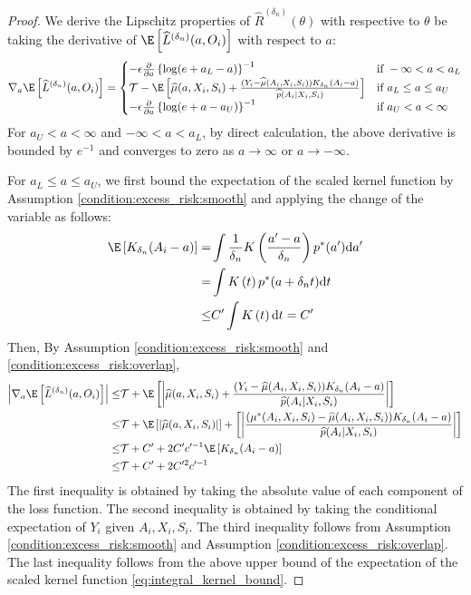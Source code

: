 \begin{proof}
\noindent We derive the Lipschitz properties of $\widehat R^{({\delta_n})}(\theta)$ with respective to $\theta$ be taking the derivative of $\E\left[\widehat L^{({\delta_n})}(a,O_i)\right]$ with respect to $a$:
    \begin{equation*}
        \nabla_a\E\left[\widehat L^{({\delta_n})}(a,O_i)\right] = \begin{cases}
     -\epsilon \frac{\partial}{\partial a}\left\{\log( e + a_L- a)\right\}^{-1}& \text{if } -\infty<a<a_L\\
    \mathcal{T} - \E\left[\widehat\mu(a,X_i,S_i)+ \frac{(Y_i - \widehat\mu(A_i,X_i,S_i))K_{\delta_n}(A_i-a)}{\widehat p(A_{i}|X_{i},S_{i})}\right]&\text{if }  a_L\leq a\leq a_U\\
     -\epsilon \frac{\partial}{\partial a}\left\{\log( e + a- a_U)\right\}^{-1}&\text{if }  a_U<a< \infty
\end{cases}
    \end{equation*}
For $a_U<a< \infty$ and $-\infty<a<a_L$, by direct calculation, the above derivative is bounded by $e^{-1}$ and converges to zero as $a\rightarrow \infty$ or $a\rightarrow -\infty$. 

For $a_L\leq a\leq a_U$, we first bound the expectation of the scaled kernel function
by Assumption \ref{condition:excess_risk:smooth} and applying the change of the variable as follows:
\begin{align}
    \E\left[K_{\delta_n}(A_i-a)\right] = & \int \frac{1}{\delta_n} K\left(\frac{a^\prime -a}{\delta_n}\right) p^*(a^\prime)\mathrm{d}a^\prime\nonumber\\
    = & \int K\left(t\right) p^*(a+\delta_n t)\mathrm{d}t\nonumber\\
    \leq & C^\prime\int K\left(t\right)\mathrm{d}t = C^\prime\label{eq:integral_kernel_bound}
\end{align}    
Then, By Assumption \ref{condition:excess_risk:smooth} and \ref{condition:excess_risk:overlap},
\begin{align*}
\left|\nabla_a\E\left[\widehat L^{({\delta_n})}(a,O_i)\right]\right|\leq &\mathcal{T}+\E\left[\left|\widehat\mu(a,X_i,S_i)+ \frac{(Y_i - \widehat\mu(A_i,X_i,S_i))K_{\delta_n}(A_i-a)}{\widehat p(A_{i}|X_{i},S_{i})}\right|\right]\\
\leq &\mathcal{T}+\E\left[\left|\widehat\mu(a,X_i,S_i)\right|\right]+\left[\left|\frac{(\mu^*(A_i,X_i,S_i) - \widehat\mu(A_i,X_i,S_i))K_{\delta_n}(A_i-a)}{\widehat p(A_{i}|X_{i},S_{i})}\right|\right]\\
    \leq & \mathcal{T}+C^\prime + 2C^\prime c^{\prime-1}\E\left[K_{\delta_n}(A_i-a)\right]\\
    \leq & \mathcal{T}+C^\prime + 2C^{\prime2}c^{\prime-1}
\end{align*}
The first inequality is obtained by taking the absolute value of each component of the loss function. The second inequality is obtained by taking the conditional expectation of $Y_i$ given $A_i,X_i,S_i$. The third inequality follows from Assumption \ref{condition:excess_risk:smooth} and Assumption \ref{condition:excess_risk:overlap}. The last inequality follows from the above upper bound of the expectation of the scaled kernel function \eqref{eq:integral_kernel_bound}. 


\end{proof}
